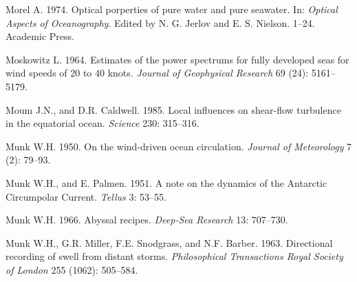 \begin{thebibliography}{999}
Morel A.  1974. Optical porperties of pure water and pure
seawater. In: \textit{Optical Aspects of Ocean\-ography}. Edited by
N. G. Jerlov and E. S.  Nielson.  1--24. Academic Press.
%

Moskowitz L.  1964. Estimates of the power spectrums for fully
developed seas for wind speeds of 20 to 40 knots. \textit{Journal of
  Geophysical Research} 69 (24): 5161--5179.
%

Moum J.N., and D.R. Caldwell.  1985. Local influences on shear-flow
turbulence in the equatorial ocean. \textit{Science} 230: 315--316.
%

Munk W.H.  1950. On the wind-driven ocean circulation. \textit{Journal
  of Meteorology} 7 (2): 79--93.
%

Munk W.H., and E. Palmen.  1951. A note on the dynamics of the
Antarctic Circumpolar Current. \textit{Tellus} 3: 53--55.
%

Munk W.H.  1966. Abyssal recipes. \textit{Deep-Sea Research} 13:
707--730.
%

Munk W.H., G.R. Miller, F.E. Snodgrass, and N.F. Barber.  1963.
Directional recording of swell from distant
storms. \textit{Philosophical Transactions Royal Society of London}
255 (1062): 505--584.
%


\end{thebibliography}
